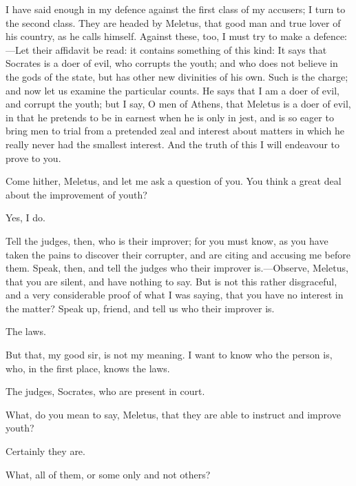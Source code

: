 \documentclass[11pt,letter]{article}
\begin{document}
\par  I have said enough in my defence against the first class of my accusers; I turn to the second class. They are headed by Meletus, that good man and true lover of his country, as he calls himself. Against these, too, I must try to make a defence:—Let their affidavit be read: it contains something of this kind: It says that Socrates is a doer of evil, who corrupts the youth; and who does not believe in the gods of the state, but has other new divinities of his own. Such is the charge; and now let us examine the particular counts. He says that I am a doer of evil, and corrupt the youth; but I say, O men of Athens, that Meletus is a doer of evil, in that he pretends to be in earnest when he is only in jest, and is so eager to bring men to trial from a pretended zeal and interest about matters in which he really never had the smallest interest. And the truth of this I will endeavour to prove to you.

\par  Come hither, Meletus, and let me ask a question of you. You think a great deal about the improvement of youth?

\par  Yes, I do.

\par  Tell the judges, then, who is their improver; for you must know, as you have taken the pains to discover their corrupter, and are citing and accusing me before them. Speak, then, and tell the judges who their improver is.—Observe, Meletus, that you are silent, and have nothing to say. But is not this rather disgraceful, and a very considerable proof of what I was saying, that you have no interest in the matter? Speak up, friend, and tell us who their improver is.

\par  The laws.

\par  But that, my good sir, is not my meaning. I want to know who the person is, who, in the first place, knows the laws.

\par  The judges, Socrates, who are present in court.

\par  What, do you mean to say, Meletus, that they are able to instruct and improve youth?

\par  Certainly they are.

\par  What, all of them, or some only and not others?
\end{document}
